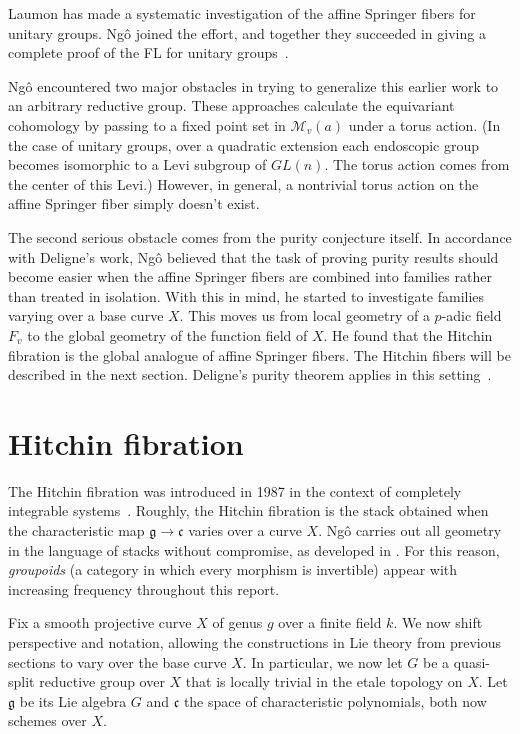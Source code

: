 \documentclass[brochure,english,12pt]{bourbaki}
\theoremstyle{plain}
\def\g{\mathfrak{g}}
\def\cc{\mathfrak{c}}
\def\M{{\mathcal M}}
\begin{document}
Laumon has made a systematic investigation of
the affine Springer fibers for unitary groups.  Ng\^o joined the effort, and together they
succeeded in giving a complete proof of the FL for unitary groups~\cite{LN:08}.

Ng\^o encountered two major obstacles in trying to generalize this
earlier work to an arbitrary reductive group.  These approaches
calculate the equivariant cohomology by passing to a fixed point set in $\M_v(a)$
under a torus action.  (In the case of unitary
groups, over a quadratic extension each endoscopic group becomes
isomorphic to a Levi subgroup of $GL(n)$.  The torus action comes from
the center of this Levi.)  However, in general, a nontrivial torus
action on the affine Springer fiber simply doesn't exist.

The second serious obstacle comes from the purity conjecture itself.
In accordance with Deligne's work, Ng\^o believed that the task of
proving purity results should become easier when the affine Springer
fibers are combined into families rather than treated in isolation.
With this in mind, he started to investigate families varying over a
base curve $X$.  This moves us from local geometry of a $p$-adic
field $F_v$ to the global geometry of the function field of $X$.  He
found that the Hitchin fibration is the global analogue of affine
Springer fibers.  The Hitchin fibers will be
described in the next section.  Deligne's purity theorem applies in this
setting~\cite{Deligne:Weil2}.



\section{Hitchin fibration}

The Hitchin fibration was introduced in 1987 in the context of
completely integrable systems~\cite{Hitchin:87}.  Roughly, the Hitchin
fibration is the stack obtained when the characteristic map
$\g\to\cc$ varies over a curve $X$.  Ng\^o carries out all geometry
 in the language of stacks without compromise, as developed in
\cite{LMB:2000}.  For this reason, {\it groupoids} (a category in which
every morphism is invertible) appear with increasing frequency throughout this report.

Fix a smooth projective curve $X$ of genus $g$ over a finite field
$k$.  We now shift perspective and notation, allowing the
constructions in Lie theory from previous sections to vary over the
base curve $X$.  In particular, we now let $G$ be a quasi-split
reductive group over $X$ that is locally trivial in the etale topology on
$X$.  Let $\g$ be its Lie algebra $G$ and $\cc$ the space of
characteristic polynomials, both now schemes over $X$.
\end{document}
